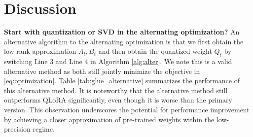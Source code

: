 \section{Discussion}
\label{sec:discussion}
\textbf{Start with quantization or SVD in the alternating optimization?}
An alternative algorithm to the alternating optimization is that we first obtain the low-rank approximation $A_t, B_t$ and then obtain the quantized weight $Q_t$ by switching Line 3 and Line 4 in Algorithm \ref{alg:alter}. We note this is a valid alternative method as both still jointly minimize the objective in \eqref{eq:optimization}. Table \ref{tab:glue_alternative} summarizes the performance of this alternative method. It is noteworthy that the alternative method still outperforms QLoRA significantly, even though it is worse than the primary version. This observation underscores the potential for performance improvement by achieving a closer approximation of pre-trained weights within the low-precision regime.



